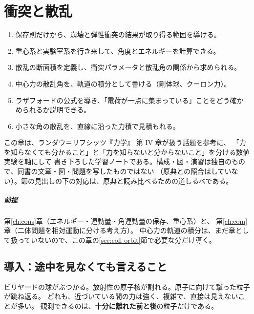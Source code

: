 \chapter{衝突と散乱}\label{ch:coll}

\begin{objectives}
\begin{enumerate}
  \item 保存則だけから、崩壊と弾性衝突の結果が取り得る範囲を導ける。
  \item 重心系と実験室系を行き来して、角度とエネルギーを計算できる。
  \item 散乱の断面積を定義し、衝突パラメータと散乱角の関係から求められる。
  \item 中心力の散乱角を、軌道の積分として書ける（剛体球、クーロン力）。
  \item ラザフォードの公式を導き、「電荷が一点に集まっている」ことをどう確かめられるか説明できる。
  \item 小さな角の散乱を、直線に沿った力積で見積もれる。
\end{enumerate}
\end{objectives}

\begin{note}
この章は、ランダウ＝リフシッツ『力学』\cite{ll-mech} 第 IV 章が扱う話題を参考に、
「力を知らなくても分かること」と「力を知らないと分からないこと」を分ける数値実験を軸にして
書き下ろした学習ノートである。構成・図・演習は独自のもので、同書の文章・図・問題を写したものではない
（原典との照合はしていない）。節の見出しの下の対応は、原典と読み比べるための道しるべである。
\end{note}

\paragraph{前提}
第\ref{ch:cons}章（エネルギー・運動量・角運動量の保存、重心系）と、
第\ref{ch:eom}章（二体問題を相対運動に分ける考え方）。
中心力の軌道の積分は、まだ章として扱っていないので、この章の\ref{sec:coll-orbit}節で必要な分だけ導く。

\section{導入：途中を見なくても言えること}\label{sec:coll-intro}

ビリヤードの球がぶつかる。放射性の原子核が割れる。原子に向けて撃った粒子が跳ね返る。
どれも、近づいている間の力は強く、複雑で、直接は見えないことが多い。
観測できるのは、\textbf{十分に離れた前と後}の粒子だけである。

